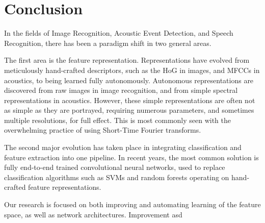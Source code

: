 \documentclass[12pt]{llncs}
\begin{document}

\section{Conclusion}
\label{sec:litreviewconclusion}
In the fields of Image Recognition, Acoustic Event Detection, and Speech Recognition, there has been a paradigm shift in two general areas. 

The first area is the feature representation. Representations have evolved from meticulously hand-crafted descriptors, such as the HoG in images, and  MFCCs in acoustics, to being learned fully autonomously. Autonomous representations are discovered from raw images in image recognition, and from simple spectral representations in acoustics. However, these simple representations are often not as simple as they are portrayed, requiring numerous parameters, and sometimes multiple resolutions, for full effect. This is most commonly seen with the overwhelming practice of using Short-Time Fourier transforms. 

The second major evolution has taken place in integrating classification and feature extraction into one pipeline. In recent years, the most common solution is fully end-to-end trained convolutional neural networks, used to replace classification algorithms such as SVMs and random forests operating on hand-crafted feature representations. 

Our research is focused on both improving and automating learning of the feature space, as well as network architectures. Improvement 
asd



\end{document}
